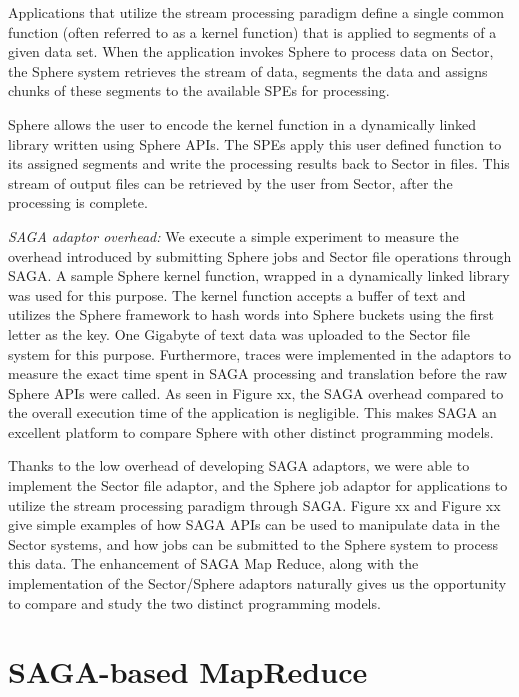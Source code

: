 \documentclass[3p,twocolumn]{elsarticle}
\begin{document}
Applications that utilize the stream processing paradigm define a
single common function (often referred to as a kernel function) that
is applied to segments of a given data set. When the application
invokes Sphere to process data on Sector, the Sphere system retrieves
the stream of data, segments the data and assigns chunks of these
segments to the available SPEs for processing.

Sphere allows the user to encode the kernel function in a dynamically
linked library written using Sphere APIs. The SPEs apply this user
defined function to its assigned segments and write the processing
results back to Sector in files. This stream of output files can be
retrieved by the user from Sector, after the processing is
complete. 


{\it SAGA adaptor overhead: } We execute a simple experiment to
measure the overhead introduced by submitting Sphere jobs and Sector
file operations through SAGA. A sample Sphere kernel function, wrapped
in a dynamically linked library was used for this purpose. The kernel
function accepts a buffer of text and utilizes the Sphere framework to
hash words into Sphere buckets using the first letter as the key. One
Gigabyte of text data was uploaded to the Sector file system for this
purpose.  Furthermore, traces were implemented in the adaptors to
measure the exact time spent in SAGA processing and translation before
the raw Sphere APIs were called.  As seen in Figure xx, the SAGA
overhead compared to the overall execution time of the application is
negligible. This makes SAGA an excellent platform to compare Sphere
with other distinct programming models.

Thanks to the low overhead of developing SAGA adaptors, we were able
to implement the Sector file adaptor, and the Sphere job adaptor for
applications to utilize the stream processing paradigm through
SAGA. Figure xx and Figure xx give simple examples of how SAGA APIs
can be used to manipulate data in the Sector systems, and how jobs can
be submitted to the Sphere system to process this data.  The
enhancement of SAGA Map Reduce, along with the implementation of the
Sector/Sphere adaptors naturally gives us the opportunity to compare
and study the two distinct programming models.



\section{SAGA-based MapReduce}
\label{sec:mr}
\end{document}
